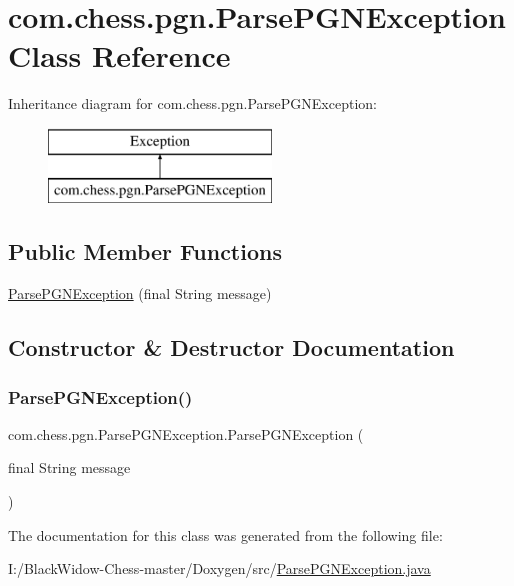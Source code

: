 \hypertarget{classcom_1_1chess_1_1pgn_1_1_parse_p_g_n_exception}{}\section{com.\+chess.\+pgn.\+Parse\+P\+G\+N\+Exception Class Reference}
\label{classcom_1_1chess_1_1pgn_1_1_parse_p_g_n_exception}
Inheritance diagram for com.\+chess.\+pgn.\+Parse\+P\+G\+N\+Exception\+:\begin{figure}[H]
\begin{center}
\leavevmode
\includegraphics[height=2.000000cm]{classcom_1_1chess_1_1pgn_1_1_parse_p_g_n_exception}
\end{center}
\end{figure}
\subsection*{Public Member Functions}
\begin{DoxyCompactItemize}
\item 
\mbox{\hyperlink{classcom_1_1chess_1_1pgn_1_1_parse_p_g_n_exception_ac4b871c9a9e7be49ff6db8ee4f2549f7}{Parse\+P\+G\+N\+Exception}} (final String message)
\end{DoxyCompactItemize}


\subsection{Constructor \& Destructor Documentation}
\mbox{\label{classcom_1_1chess_1_1pgn_1_1_parse_p_g_n_exception_ac4b871c9a9e7be49ff6db8ee4f2549f7}} 
\subsubsection{\texorpdfstring{ParsePGNException()}{ParsePGNException()}}
{\footnotesize\ttfamily com.\+chess.\+pgn.\+Parse\+P\+G\+N\+Exception.\+Parse\+P\+G\+N\+Exception (\begin{DoxyParamCaption}\item[{final String}]{message }\end{DoxyParamCaption})}



The documentation for this class was generated from the following file\+:\begin{DoxyCompactItemize}
\item 
I\+:/\+Black\+Widow-\/\+Chess-\/master/\+Doxygen/src/\mbox{\hyperlink{_parse_p_g_n_exception_8java}{Parse\+P\+G\+N\+Exception.\+java}}\end{DoxyCompactItemize}
